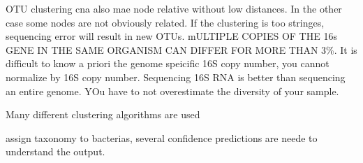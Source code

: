 OTU clustering cna also mae node  relative without low distances. In the other case some nodes are not obviously related. If the clustering is too stringes, sequencing error will result in new OTUs. mULTIPLE COPIES OF THE 16s GENE IN THE SAME ORGANISM CAN DIFFER FOR MORE THAN 3\%. It is difficult to know a priori the genome speicific 16S copy number, you cannot normalize by 16S copy number. Sequencing 16S RNA is better than sequencing an entire genome. YOu have to not overestimate the diversity of your sample. 

Many different clustering algorithms are used 



assign taxonomy to bacterias, several confidence predictions are neede to understand the output. 
